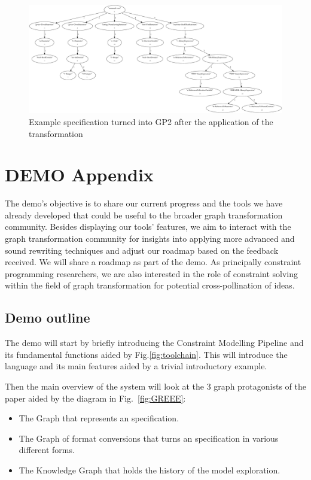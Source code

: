 \documentclass[runningheads]{llncs}
\begin{document}
\begin{figure}[htb]
\begin{center}
\includegraphics[angle=90,height=0.9\textheight,width=\textwidth]{demorg-AFTER.pdf}
\caption{Example specification turned into GP2 after the application of the transformation}
\end{center}
\label{fig:demorg-AFTER}
\end{figure}


\clearpage
\section{DEMO Appendix}


The demo's objective is to share our current progress and the tools we have already developed that could be useful to the broader graph transformation community.
Besides displaying our tools' features, we aim to interact with the graph transformation community for insights into applying more advanced and sound rewriting techniques and adjust our roadmap based on the feedback received. We will share a roadmap as part of the demo.
As principally constraint programming researchers, we are also interested in the role of constraint solving within the field of graph transformation for potential cross-pollination of ideas.

\subsection{Demo outline}

The demo will start by briefly introducing the Constraint Modelling Pipeline and its fundamental functions aided by Fig.\ref{fig:toolchain}. This will introduce the \essence language and its main features aided by a trivial introductory example.

Then the main overview of the system will look at the 3 graph protagonists of the paper aided by the diagram in Fig.~\ref{fig:GREEE}:
\begin{itemize}
    \item The Graph that represents an \essence specification.
    \item The Graph of format conversions that turns an \essence specification in various different forms.
    \item The Knowledge Graph that holds the history of the model exploration.
\end{itemize}
\end{document}
